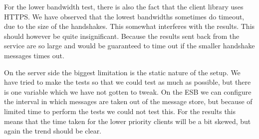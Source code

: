 	For the lower bandwidth test, there is also the fact that the client library uses HTTPS. We have observed that the lowest bandwidths sometimes do timeout, due to the size of the handshakes. This somewhat interferes with the results. This should however be quite insignificant. Because the results sent back from the service are so large and would be guaranteed to time out if the smaller handshake messages times out.
	
	On the server side the biggest limitation is the static nature of the setup. We have tried to make the tests so that we could test as much as possible, but there is one variable which we have not gotten to tweak. On the ESB we can configure the interval in which messages are taken out of the message store, but because of limited time to perform the tests we could not test this. For the results this means that the time taken for the lower priority clients will be a bit skewed, but again the trend should be clear.
